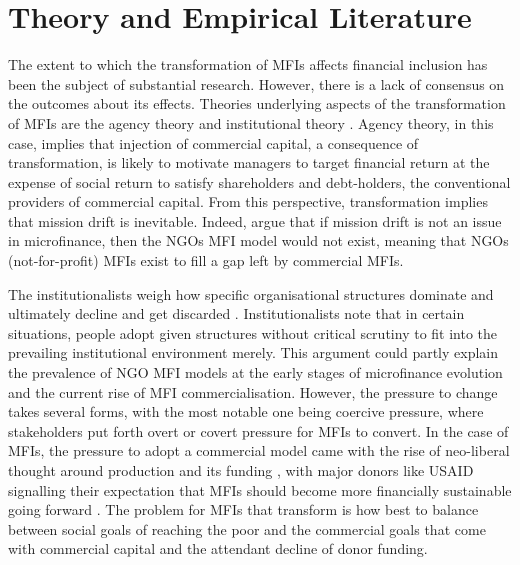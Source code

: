 \documentclass[a4paper, nobind]{templates/ociamthesis}
\begin{document}
\hypertarget{theory-and-empirical-literature}{%
\section{Theory and Empirical Literature}\label{theory-and-empirical-literature}}

The extent to which the transformation of MFIs affects financial inclusion has been the subject of substantial research. However, there is a lack of consensus on the outcomes about its effects. Theories underlying aspects of the transformation of MFIs are the agency theory \autocite{jensen1976theory} and institutional theory \autocite{powell2012new}. Agency theory, in this case, implies that injection of commercial capital, a consequence of transformation, is likely to motivate managers to target financial return at the expense of social return to satisfy shareholders and debt-holders, the conventional providers of commercial capital. From this perspective, transformation implies that mission drift is inevitable. Indeed, \textcite{morduch2019challenges} argue that if mission drift is not an issue in microfinance, then the NGOs MFI model would not exist, meaning that NGOs (not-for-profit) MFIs exist to fill a gap left by commercial MFIs.

The institutionalists weigh how specific organisational structures dominate and ultimately decline and get discarded \autocite{powell2012new}. Institutionalists note that in certain situations, people adopt given structures without critical scrutiny to fit into the prevailing institutional environment merely. This argument could partly explain the prevalence of NGO MFI models at the early stages of microfinance evolution and the current rise of MFI commercialisation. However, the pressure to change takes several forms, with the most notable one being coercive pressure, where stakeholders put forth overt or covert pressure for MFIs to convert. In the case of MFIs, the pressure to adopt a commercial model came with the rise of neo-liberal thought around production and its funding \autocite{bateman2010doesn}, with major donors like USAID signalling their expectation that MFIs should become more financially sustainable going forward \autocite{d2013unsubsidized}. The problem for MFIs that transform is how best to balance between social goals of reaching the poor and the commercial goals that come with commercial capital and the attendant decline of donor funding.
\end{document}
